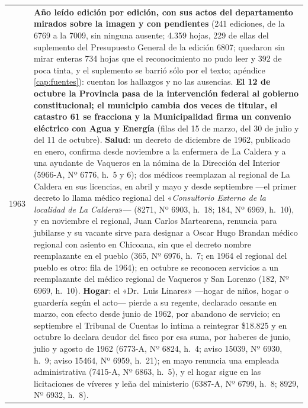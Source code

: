 \begin{longtable}{@{}p{2.7cm}p{10.3cm}@{}}
1963 & \textbf{Año leído edición por edición, con sus actos del departamento mirados sobre la imagen y con pendientes} (241 ediciones, de la 6769 a la 7009, sin ninguna ausente; 4.359 hojas, 229 de ellas del suplemento del Presupuesto General de la edición 6807; quedaron sin mirar enteras 734 hojas que el reconocimiento no pudo leer y 392 de poca tinta, y el suplemento se barrió sólo por el texto; apéndice \ref{cap:fuentes}): cuentan los hallazgos y no las ausencias. \textbf{El 12 de octubre la Provincia pasa de la intervención federal al gobierno constitucional; el municipio cambia dos veces de titular, el catastro 61 se fracciona y la Municipalidad firma un convenio eléctrico con Agua y Energía} (filas del 15 de marzo, del 30 de julio y del 11 de octubre). \textbf{Salud}: un decreto de diciembre de 1962, publicado en enero, confirma desde noviembre a la enfermera de La Caldera y a una ayudante de Vaqueros en la nómina de la Dirección del Interior (5966-A, Nº 6776, h.\ 5 y 6); dos médicos reemplazan al regional de La Caldera en sus licencias, en abril y mayo y desde septiembre ---el primer decreto lo llama médico regional del «\textit{Consultorio Externo de la localidad de La Caldera}»--- (8271, Nº 6903, h.\ 18; 184, Nº 6969, h.\ 10), y en noviembre el regional, Juan Carlos Martearena, renuncia para jubilarse y su vacante sirve para designar a Oscar Hugo Brandan médico regional con asiento en Chicoana, sin que el decreto nombre reemplazante en el pueblo (365, Nº 6976, h.\ 7; en 1964 el regional del pueblo es otro: fila de 1964); en octubre se reconocen servicios a un reemplazante del médico regional de Vaqueros y San Lorenzo (182, Nº 6969, h.\ 10). \textbf{Hogar}: el «Dr.\ Luis Linares» ---hogar de niños, hogar o guardería según el acto--- pierde a su regente, declarado cesante en marzo, con efecto desde junio de 1962, por abandono de servicio; en septiembre el Tribunal de Cuentas lo intima a reintegrar \$18.825 y en octubre lo declara deudor del fisco por esa suma, por haberes de junio, julio y agosto de 1962 (6773-A, Nº 6824, h.\ 4; aviso 15039, Nº 6930, h.\ 9; aviso 15464, Nº 6959, h.\ 21); en mayo renuncia una empleada administrativa (7415-A, Nº 6863, h.\ 5), y el hogar sigue en las licitaciones de víveres y leña del ministerio (6387-A, Nº 6799, h.\ 8; 8929, Nº 6932, h.\ 8). \\

\end{longtable}
